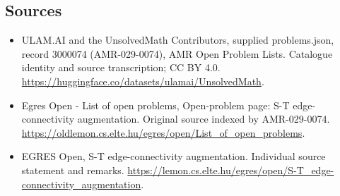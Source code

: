 \documentclass[11pt,a4paper]{article}
\begin{document}
\subsection{Sources}
\begin{itemize}
\item[S1] ULAM.AI and the UnsolvedMath Contributors, supplied problems.json, record 3000074 (AMR-029-0074), AMR Open Problem Lists. Catalogue identity and source transcription; CC BY 4.0.
\url{https://huggingface.co/datasets/ulamai/UnsolvedMath}.
\item[S2] Egres Open - List of open problems, Open-problem page: S-T edge-connectivity augmentation. Original source indexed by AMR-029-0074.
\url{https://oldlemon.cs.elte.hu/egres/open/List_of_open_problems}.
\item[S3] EGRES Open, S-T edge-connectivity augmentation. Individual source statement and remarks.
\url{https://lemon.cs.elte.hu/egres/open/S-T_edge-connectivity_augmentation}.
\end{itemize}
\end{document}
